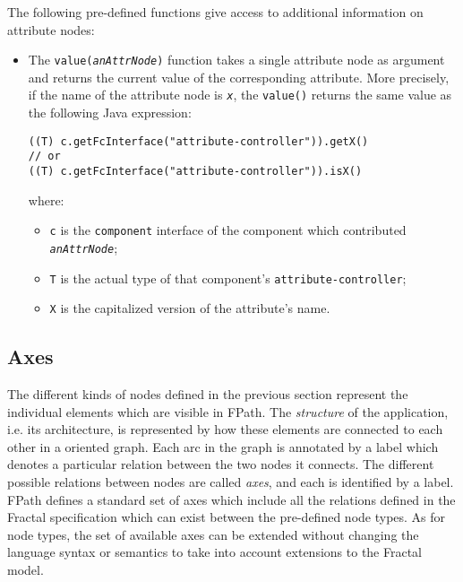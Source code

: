 \documentclass[a4paper,12pt]{report}
\newcommand{\interface}[1]{\texttt{#1}}
\newcommand{\function}[1]{\texttt{#1}}
\newcommand{\type}[1]{\texttt{#1}}
\begin{document}
The following pre-defined functions give access to additional information on attribute
nodes:
\begin{itemize}
\item The \function{value(\textsl{anAttrNode})} function takes a single attribute node as
  argument and returns the current value of the corresponding attribute. More precisely,
  if the name of the attribute node is \texttt{\textsl{x}}, the \function{value()} returns
  the same value as the following Java expression:
\begin{verbatim}
((T) c.getFcInterface("attribute-controller")).getX()
// or
((T) c.getFcInterface("attribute-controller")).isX()
\end{verbatim}
  where:
  \begin{itemize}
  \item \texttt{c} is the \interface{component} interface of the component which
    contributed \texttt{\textsl{an\-Attr\-Node}};
  \item \type{T} is the actual type of that component's \interface{attribute-controller};
  \item \texttt{X} is the capitalized version of the attribute's name.
  \end{itemize}
\end{itemize}

\subsection{Axes}
\label{sec:axes}

The different kinds of nodes defined in the previous section represent the individual
elements which are visible in FPath. The \emph{structure} of the application, i.e. its
architecture, is represented by how these elements are connected to each other in a
oriented graph. Each arc in the graph is annotated by a label which denotes a particular
relation between the two nodes it connects. The different possible relations between nodes
are called \emph{axes}, and each is identified by a label. FPath defines a standard set of
axes which include all the relations defined in the Fractal specification which can exist
between the pre-defined node types. As for node types, the set of available axes can be
extended without changing the language syntax or semantics to take into account extensions
to the Fractal model.
\end{document}
